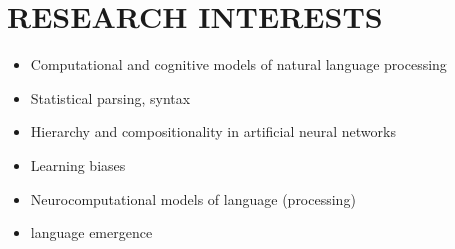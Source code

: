\section{RESEARCH INTERESTS}

\begin{itemize}
    \item Computational and cognitive models of natural language processing
    \item Statistical parsing, syntax
    \item Hierarchy and compositionality in artificial neural networks
    \item Learning biases
    \item Neurocomputational models of language (processing)
    \item language emergence
\end{itemize}